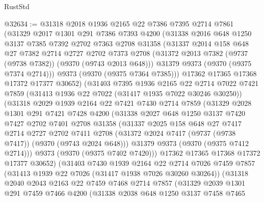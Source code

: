 \begin{lexlean}{RustStd}
\begin{coremodule}
{\begin{coremodule}
{{{{{{{{{{{{{{{{{{{{{{{{{{{{{{{{{{{{{{{@32634 := @31318
    @2018
    @1936
    @2165
    @22
    @7386
    @7395
    @2714
    @7861
    (@31329
      @2017
      @1301
      @291
      @7386
      @7393
      @4200
      (@31338
        @2016
        @648
        @1250
        @3137
        @7385
        @7392
        @2702
        @7363
        @2708
        @31358
        (@31337
          @2014
          @158
          @648
          @27
          @7382
          @2714
          @2727
          @2702
          @7373
          @2708
          (@31372 @2013 @7382 (@9737 (@9738 @7382)) (@9370 (@9743 @2013 @648)))
          @31379
          @9373
          (@9370 (@9375 @7374 @2714)))
        @9373
        (@9370 (@9375 @7364 @7385)))
      @17362
      @17365
      @17368
      @17372
      @17377
      @30652)
    (@31403
      @7395
      @1936
      @2165
      @22
      @2714
      @7022
      @7421
      @7859
      (@31413 @1936 @22 @7022 (@31417 @1935 @7022 @30246 @30250))
      (@31318
        @2029
        @1939
        @2164
        @22
        @7421
        @7430
        @2714
        @7859
        (@31329
          @2028
          @1301
          @291
          @7421
          @7428
          @4200
          (@31338
            @2027
            @648
            @1250
            @3137
            @7420
            @7427
            @2702
            @7401
            @2708
            @31358
            (@31337
              @2025
              @158
              @648
              @27
              @7417
              @2714
              @2727
              @2702
              @7411
              @2708
              (@31372 @2024 @7417 (@9737 (@9738 @7417)) (@9370 (@9743 @2024 @648)))
              @31379
              @9373
              (@9370 (@9375 @7412 @2714)))
            @9373
            (@9370 (@9375 @7402 @7420)))
          @17362
          @17365
          @17368
          @17372
          @17377
          @30652)
        (@31403
          @7430
          @1939
          @2164
          @22
          @2714
          @7026
          @7459
          @7857
          (@31413 @1939 @22 @7026 (@31417 @1938 @7026 @30260 @30264))
          (@31318
            @2040
            @2043
            @2163
            @22
            @7459
            @7468
            @2714
            @7857
            (@31329
              @2039
              @1301
              @291
              @7459
              @7466
              @4200
              (@31338
                @2038
                @648
                @1250
                @3137
                @7458
                @7465
}}}}}}}}}}}}}}}}}}}}}}}}}}}}}}}}}}}}}}}
\end{coremodule}}
\end{coremodule}
\end{lexlean}
